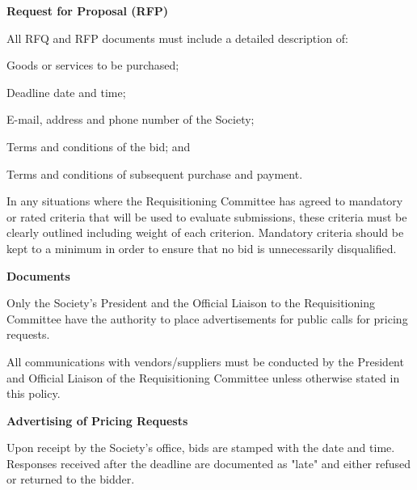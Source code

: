 \begin{longenum}[label*=\thesection.\arabic*., align=left]
\begin{longenum} [label*=\arabic*., align=left]
\end{longenum}

\item \textbf{Request for Proposal (RFP)}

\begin{longenum} [label*=\arabic*., align=left]
		\item All RFQ and RFP documents must include a detailed description of:
	\begin{longenum} [label*=\arabic*., align=left]	
		\item Goods or services to be purchased; 
	\item 	Deadline date and time;
	\item	E-mail, address and phone number of the Society; 
	\item 	Terms and conditions of the bid; and
	\item 	Terms and conditions of subsequent purchase and payment.
		
\end{longenum}
\item	In any situations where the Requisitioning Committee has agreed to mandatory or rated criteria that will be used to evaluate submissions, these criteria must be clearly outlined including weight of each criterion. Mandatory criteria should be kept to a minimum in order to ensure that no bid is unnecessarily disqualified.
\end{longenum}
\item \textbf{Documents}

\begin{longenum} [label*=\arabic*., align=left]
		\item Only the Society's President and the Official Liaison to the Requisitioning Committee have the authority to place advertisements for public calls for pricing requests.
		
		\item All communications with vendors/suppliers must be conducted by the President and Official Liaison of the Requisitioning Committee unless otherwise stated in this policy.
\end{longenum}

\item \textbf{Advertising of Pricing Requests}

\begin{longenum} [label*=\arabic*., align=left]
		\item Upon receipt by the Society's office, bids are stamped with the date and time. Responses received after the deadline are documented as "late" and either refused or returned to the bidder.
		

\end{longenum}
\end{longenum}
